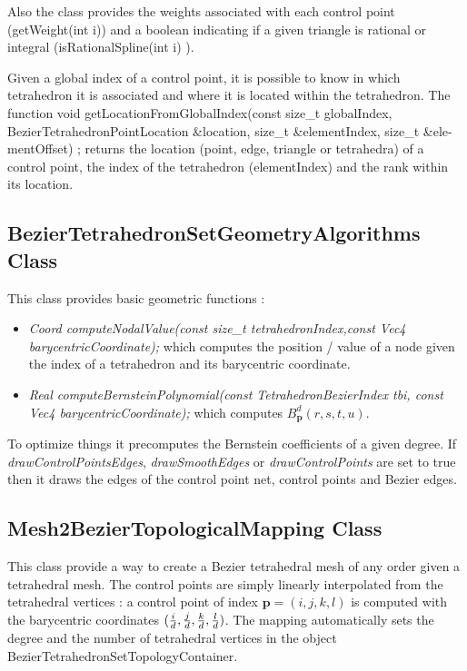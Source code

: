 \documentclass[a4paper,11pt]{article}
\begin{document}
Also the class provides the weights associated with each control point (getWeight(int i)) and
a boolean indicating if a given triangle is rational or integral (isRationalSpline(int i) ).


Given a global index of a control point, it is possible to know in which tetrahedron it is associated
and where it is located within the tetrahedron. The function void getLocationFromGlobalIndex(const
size\_t globalIndex, BezierTetrahedronPointLocation \&location, size\_t \&elementIndex, size\_t \&ele-
mentOffset) ; returns the location (point, edge, triangle or tetrahedra) of a control point, the index of the
tetrahedron (elementIndex) and the rank within its location.

\subsection{BezierTetrahedronSetGeometryAlgorithms Class}

This class provides basic geometric functions :

\begin{itemize}
	\item {\it Coord computeNodalValue(const size\_t tetrahedronIndex,const Vec4 barycentricCoordinate); } which computes the position / value of a node given the index of a tetrahedron and its barycentric coordinate.
	\item {\it Real computeBernsteinPolynomial(const TetrahedronBezierIndex tbi, const Vec4 barycentricCoordinate);} which computes $B^d_{\mathbf p}(r,s,t,u)$.
\end{itemize}

To optimize things it precomputes the Bernstein coefficients of a given degree. If {\it drawControlPointsEdges},  {\it drawSmoothEdges}  or  {\it drawControlPoints} are set to true then it draws the edges of the control point net, control points and Bezier edges.  

\subsection{Mesh2BezierTopologicalMapping Class}

This class provide a way to create a Bezier tetrahedral mesh of any order given a tetrahedral mesh. The control points are simply linearly interpolated from the tetrahedral vertices : a control point of index ${\mathbf p}=(i,j,k,l)$ is computed with the barycentric coordinates $(\frac{i}{{d}},\frac{j}{{d}},\frac{k}{{d}},\frac{l}{{d}})$. The mapping automatically sets the degree and the number of tetrahedral vertices in the object BezierTetrahedronSetTopologyContainer.
\end{document}
